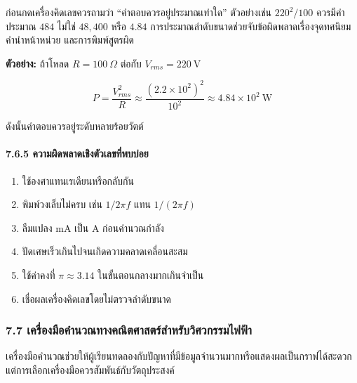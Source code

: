 ก่อนกดเครื่องคิดเลขควรถามว่า “คำตอบควรอยู่ประมาณเท่าใด” ตัวอย่างเช่น $220^2/100$ ควรมีค่าประมาณ $484$ ไม่ใช่ $48{,}400$ หรือ $4.84$ การประมาณลำดับขนาดช่วยจับข้อผิดพลาดเรื่องจุดทศนิยม คำนำหน้าหน่วย และการพิมพ์สูตรผิด

\textbf{ตัวอย่าง:} ถ้าโหลด $R=100\ \Omega$ ต่อกับ $V_{rms}=220\ \mathrm{V}$

\[
P=\frac{V_{rms}^2}{R}\approx\frac{(2.2\times10^2)^2}{10^2}\approx4.84\times10^2\ \mathrm{W}
\]

ดังนั้นคำตอบควรอยู่ระดับหลายร้อยวัตต์

\paragraph{7.6.5 ความผิดพลาดเชิงตัวเลขที่พบบ่อย}

\begin{enumerate}
    \item ใช้องศาแทนเรเดียนหรือกลับกัน
    \item พิมพ์วงเล็บไม่ครบ เช่น $1/2\pi f$ แทน $1/(2\pi f)$
    \item ลืมแปลง mA เป็น A ก่อนคำนวณกำลัง
    \item ปัดเศษเร็วเกินไปจนเกิดความคลาดเคลื่อนสะสม
    \item ใช้ค่าคงที่ $\pi\approx3.14$ ในขั้นตอนกลางมากเกินจำเป็น
    \item เชื่อผลเครื่องคิดเลขโดยไม่ตรวจลำดับขนาด
\end{enumerate}

 

\subsubsection{7.7 เครื่องมือคำนวณทางคณิตศาสตร์สำหรับวิศวกรรมไฟฟ้า}

เครื่องมือคำนวณช่วยให้ผู้เรียนทดลองกับปัญหาที่มีข้อมูลจำนวนมากหรือแสดงผลเป็นกราฟได้สะดวก แต่การเลือกเครื่องมือควรสัมพันธ์กับวัตถุประสงค์

